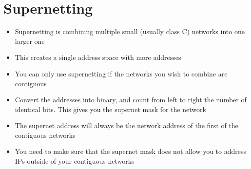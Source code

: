 \section*{Supernetting}

\begin{itemize}
  \item Supernetting is combining multiple small (usually class C) networks into one larger one
  \item This creates a single address space with more addresses
  \item You can only use supernetting if the networks you wish to combine are contiguous
  \item Convert the addresses into binary, and count from left to right the number of identical bits. This gives you the supernet mask for the network
  \item The supernet address will always be the network address of the first of the contiguous networks
  \item You need to make sure that the supernet mask does not allow you to address IPs outside of your contiguous networks
\end{itemize}